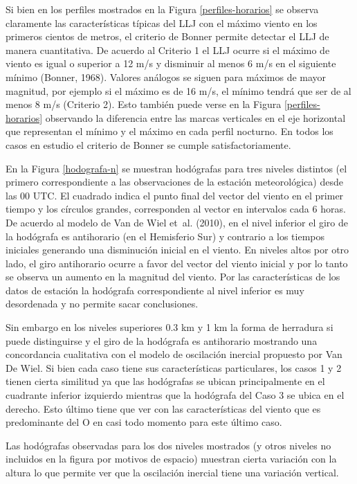 \documentclass[12pt,spanish,oneside, a4paper]{book}
\begin{document}
Si bien en los perfiles mostrados en la Figura \ref{perfiles-horarios}
se observa claramente las características típicas del LLJ con el máximo
viento en los primeros cientos de metros, el criterio de Bonner permite
detectar el LLJ de manera cuantitativa. De acuerdo al Criterio 1 el LLJ
ocurre si el máximo de viento es igual o superior a 12 m/s y disminuir
al menos 6 m/s en el siguiente mínimo (Bonner, 1968). Valores análogos
se siguen para máximos de mayor magnitud, por ejemplo si el máximo es de
16 m/s, el mínimo tendrá que ser de al menos 8 m/s (Criterio 2). Esto
también puede verse en la Figura \ref{perfiles-horarios} observando la
diferencia entre las marcas verticales en el eje horizontal que
representan el mínimo y el máximo en cada perfil nocturno. En todos los
casos en estudio el criterio de Bonner se cumple satisfactoriamente.

En la Figura \ref{hodografa-n} se muestran hodógrafas para tres niveles
distintos (el primero correspondiente a las observaciones de la estación
meteorológica) desde las 00 UTC. El cuadrado indica el punto final del
vector del viento en el primer tiempo y los círculos grandes,
corresponden al vector en intervalos cada 6 horas. De acuerdo al modelo
de Van de Wiel et~al. (2010), en el nivel inferior el giro de la
hodógrafa es antihorario (en el Hemisferio Sur) y contrario a los
tiempos iniciales generando una disminución inicial en el viento. En
niveles altos por otro lado, el giro antihorario ocurre a favor del
vector del viento inicial y por lo tanto se observa un aumento en la
magnitud del viento. Por las características de los datos de estación la
hodógrafa correspondiente al nivel inferior es muy desordenada y no
permite sacar conclusiones.

Sin embargo en los niveles superiores 0.3 km y 1 km la forma de
herradura si puede distinguirse y el giro de la hodógrafa es antihorario
mostrando una concordancia cualitativa con el modelo de oscilación
inercial propuesto por Van De Wiel. Si bien cada caso tiene sus
características particulares, los casos 1 y 2 tienen cierta similitud ya
que las hodógrafas se ubican principalmente en el cuadrante inferior
izquierdo mientras que la hodógrafa del Caso 3 se ubica en el derecho.
Esto último tiene que ver con las características del viento que es
predominante del O en casi todo momento para este último caso.

Las hodógrafas observadas para los dos niveles mostrados (y otros
niveles no incluidos en la figura por motivos de espacio) muestran
cierta variación con la altura lo que permite ver que la oscilación
inercial tiene una variación vertical.
\end{document}
